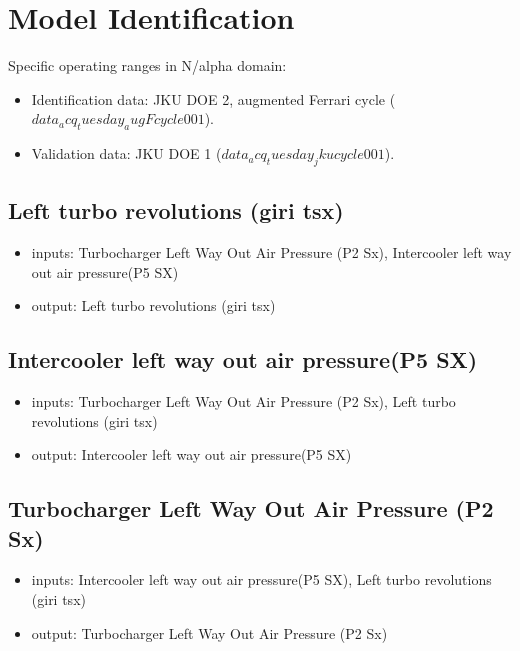 
\section{Model Identification}
\label{sec:modelidentification}

Specific operating ranges  in N/alpha domain:
\begin{itemize}
	\item{Identification data: JKU DOE 2, augmented Ferrari cycle ($data_acq_tuesday_augFcycle001$).}
	\item{Validation data: JKU DOE 1 ($data_acq_tuesday_jkucycle001$).}
\end{itemize}

\subsection{Left turbo revolutions (giri tsx)}
\begin{itemize}
	\item{inputs: Turbocharger Left Way Out Air Pressure (P2 Sx), Intercooler left way out air pressure(P5 SX)}
	\item{output: Left turbo revolutions (giri tsx)}
\end{itemize}	




\subsection{Intercooler left way out air pressure(P5 SX)}
\begin{itemize}
	\item{inputs: Turbocharger Left Way Out Air Pressure (P2 Sx), Left turbo revolutions (giri tsx)}
	\item{output: Intercooler left way out air pressure(P5 SX)}
\end{itemize}	



\subsection{Turbocharger Left Way Out Air Pressure (P2 Sx)}
\begin{itemize}
	\item{inputs: Intercooler left way out air pressure(P5 SX), Left turbo revolutions (giri tsx)}
	\item{output: Turbocharger Left Way Out Air Pressure (P2 Sx)}
\end{itemize}	

